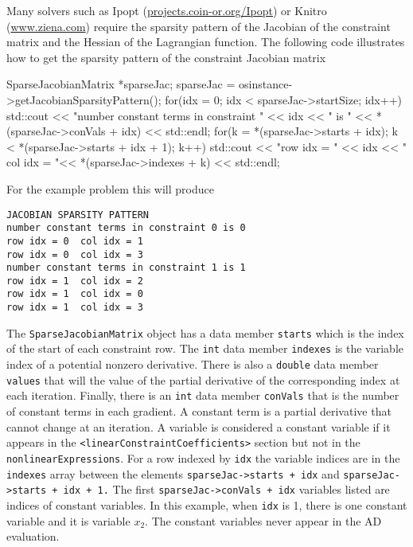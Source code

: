 \documentclass[11pt]{article}
\renewcommand{\_}{{\char"5F}}
\renewcommand{\{}{{\char"7B}}
\renewcommand{\}}{{\char"7D}}
\renewcommand{\^}{{\char"0D}}
\renewcommand{\'}{{\char"0D}}
\begin{document}
Many  solvers such as Ipopt (\url{projects.coin-or.org/Ipopt}) or Knitro (\url{www.ziena.com}) require the sparsity pattern of the Jacobian of the constraint matrix and the Hessian of the Lagrangian function. The following code illustrates how to get the sparsity pattern of the constraint Jacobian matrix
\begin{verbatimtab}[4]
SparseJacobianMatrix *sparseJac;
sparseJac = osinstance->getJacobianSparsityPattern();
for(idx = 0; idx < sparseJac->startSize; idx++){
	std::cout << "number constant terms in constraint "   <<  idx << " is "
	<< *(sparseJac->conVals + idx)  << std::endl;
	for(k = *(sparseJac->starts + idx); k < *(sparseJac->starts + idx + 1); k++){
		std::cout << "row idx = " << idx <<  "
		col idx = "<< *(sparseJac->indexes + k) << std::endl;
	}
}
\end{verbatimtab}
For the example problem this will produce
\begin{verbatim}
JACOBIAN SPARSITY PATTERN
number constant terms in constraint 0 is 0
row idx = 0  col idx = 1
row idx = 0  col idx = 3
number constant terms in constraint 1 is 1
row idx = 1  col idx = 2
row idx = 1  col idx = 0
row idx = 1  col idx = 3
\end{verbatim}
The {\tt SparseJacobianMatrix} object has a data member {\tt starts} which is the index of the start of each constraint row. The {\tt int} data member {\tt indexes} is the variable index of a potential nonzero derivative. There is also a {\tt double} data member  {\tt values} that will the value of the partial derivative of the corresponding index at each iteration. Finally, there is an {\tt int} data member {\tt conVals} that is the number of constant terms in each gradient. A constant term is a partial derivative that cannot change at an iteration.  A variable is considered a constant variable if it appears in the {\tt <linearConstraintCoefficients>} section  but not in the {\tt nonlinearExpressions}.  For a row indexed by {\tt idx} the variable indices are in the  {\tt indexes} array between the elements {\tt sparseJac->starts + idx} and {\tt sparseJac->starts + idx + 1.}   The first  {\tt sparseJac->conVals + idx} variables listed are indices of constant variables. In this example, when {\tt idx} is 1, there is one constant variable and it is variable $x_{2}.$  The constant variables never appear in the AD evaluation.
\end{document}
